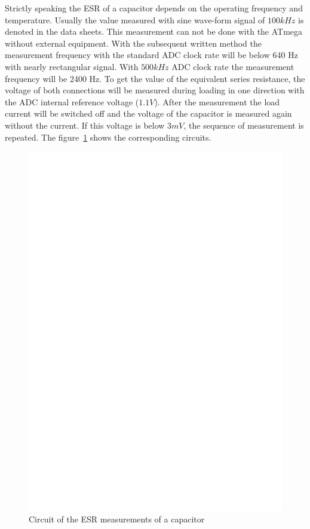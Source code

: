 Strictly speaking the ESR of a capacitor depends on the operating frequency and temperature.
Usually the value measured with sine wave-form signal of \(100kHz\) is denoted in the data sheets.
This measurement can not be done with the ATmega without external equipment.
With the subsequent written method the measurement frequency with the standard ADC clock rate will be below 640 Hz
with nearly rectangular signal. With \(500kHz\) ADC clock rate the measurement frequency will be 2400 Hz.
To get the value of the equivalent series resistance,
the voltage of both connections will be measured during loading in one direction with the ADC internal reference 
voltage (\(1.1V\)).
After the measurement the load current will be switched off and the voltage of the capacitor is measured
again without the current.
If this voltage is below \(3mV\), the sequence of measurement is repeated.
The figure~\ref{fig:Cap_esr} shows the corresponding circuits.

\begin{figure}[H]
  \centering
    \includegraphics[]{../FIG/Cap_esr.eps}
  \caption{Circuit of the ESR measurements of a capacitor}
  \label{fig:Cap_esr}
\end{figure}


